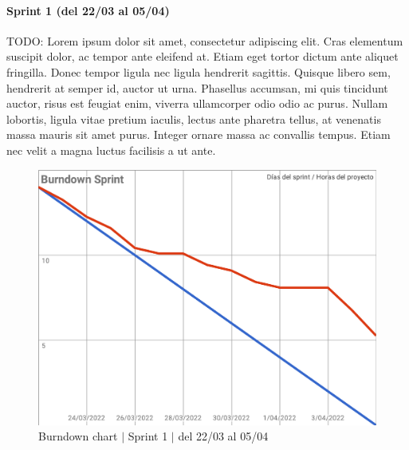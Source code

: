 \paragraph{Sprint 1 (del 22/03 al 05/04)} 
TODO: Lorem ipsum dolor sit amet, consectetur adipiscing elit. Cras elementum suscipit dolor, ac tempor ante eleifend at. Etiam eget tortor dictum ante aliquet fringilla. Donec tempor ligula nec ligula hendrerit sagittis. Quisque libero sem, hendrerit at semper id, auctor ut urna. Phasellus accumsan, mi quis tincidunt auctor, risus est feugiat enim, viverra ullamcorper odio odio ac purus. Nullam lobortis, ligula vitae pretium iaculis, lectus ante pharetra tellus, at venenatis massa mauris sit amet purus. Integer ornare massa ac convallis tempus. Etiam nec velit a magna luctus facilisis a ut ante.
\begin{figure}[H]
    \centering
    \includegraphics[width=1\linewidth]{text/image/BurndownChart1.pdf}
    \caption{Burndown chart $|$ Sprint 1 $|$ del 22/03 al 05/04}
    \label{fig:burndown_chart_1}
\end{figure}

\newpage
